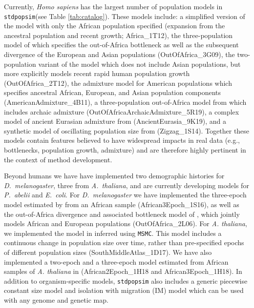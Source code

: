 \documentclass[12pt,halfline,a4paper]{ouparticle}
\newcommand{\stdpopsim}{\texttt{stdpopsim}\xspace}
\newcommand{\MSMC}{\texttt{MSMC}\xspace}
\begin{document}
Currently, {\em Homo sapiens} has the largest number of population models in
\stdpopsim (see Table \ref{tab:catalog}).  
These models include: a simplified version of the \cite{tennessen2012evolution}
model with only the African population specified (expansion from the ancestral
population and recent growth; Africa\_1T12), the three-population model of \cite{gutenkunst2009inferring}
which specifies the out-of-Africa bottleneck as well as the subsequent divergence of
the European and Asian populations (OutOfAfrica\_3G09), the \cite{tennessen2012evolution} two-population variant of the
\citeauthor{gutenkunst2009inferring} model which does not include Asian populations, but more explicitly models
recent rapid human population growth (OutOfAfrica\_2T12), the \cite{browning2018ancestry} admixture model
for American populations which specifies ancestral African, European, and Asian population
components (AmericanAdmixture\_4B11), a three-population out-of-Africa model from \cite{ragsdale2019models}
which includes archaic admixture (OutOfAfricaArchaicAdmixture\_5R19),
a complex model of ancient Eurasian admixture from \cite{kamm2019efficiently} (AncientEurasia\_9K19),
and a synthetic model of oscillating population size from \cite{schiffels2014inferring} (Zigzag\_1S14).
Together these models
contain features believed to have widespread impacts in real data (e.g., bottlenecks, population growth,
admixture) and are therefore highly pertinent in the context of method development.

Beyond humans we have have implemented two demographic histories for
\textit{D.~melanogaster}, three from \textit{A.~thaliana}, and are currently developing
models for \textit{P.~abelii} and \textit{E.~coli}.
For \textit{D.~melanogaster} we have implemented the three-epoch model estimated by \cite{sheehan2016deep} from
an African sample (African3Epoch\_1S16), as well as the out-of-Africa divergence
and associated bottleneck model of \cite{li2006inferring}, which jointly models African
and European populations (OutOfAfrica\_2L06). For \emph{A. thaliana}, we implemented the
model in \cite{durvasula2017african} inferred using \MSMC. This model includes
a continuous change in population size over time, rather than pre-specified epochs of different
population sizes (SouthMiddleAtlas\_1D17). We have also implemented a two-epoch and a three-epoch model estimated from African
samples of \emph{A. thaliana} in \cite{huber2018gene} (African2Epoch\_1H18 and African3Epoch\_1H18). 
In addition to organism-specific models, \stdpopsim also includes a generic piecewise constant size model and
isolation with migration (IM) model which can be used with any genome and genetic map.
\end{document}
